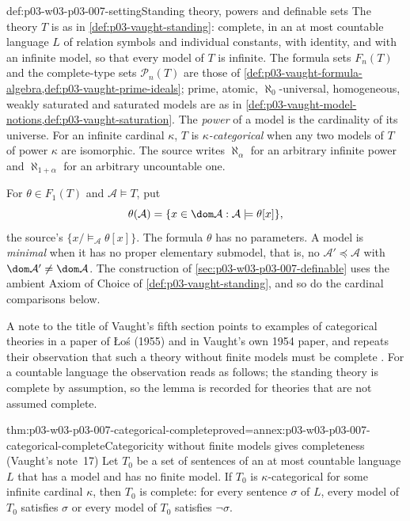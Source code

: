 \begin{hbconvention}{def:p03-w03-p03-007-setting}{Standing theory, powers and definable sets}
The theory \(T\) is as in \cref{def:p03-vaught-standing}: complete, in an at
most countable language \(L\) of relation symbols and individual constants,
with identity, and with an infinite model, so that every model of \(T\) is
infinite. The formula sets \(F_n(T)\) and the complete-type sets
\(\mathcal P_n(T)\) are those of \cref{def:p03-vaught-formula-algebra,def:p03-vaught-prime-ideals};
prime, atomic, \(\aleph_0\)-universal, homogeneous, weakly saturated and
saturated models are as in
\cref{def:p03-vaught-model-notions,def:p03-vaught-saturation}.
The \emph{power} of a model is the cardinality of its universe.
For an infinite cardinal \(\kappa\), \(T\) is \emph{\(\kappa\)-categorical}
when any two models of \(T\) of power \(\kappa\) are isomorphic. The source
writes \(\aleph_\alpha\) for an arbitrary infinite power and
\(\aleph_{1+\alpha}\) for an arbitrary uncountable one.

For \(\theta\in F_1(T)\) and \(\mathcal A\models T\), put
\[
 \theta(\mathcal A)=\{x\in\dom\mathcal A:\mathcal A\models\theta[x]\},
\]
the source's \(\{x/{\models_{\mathcal A}}\theta[x]\}\). The formula
\(\theta\) has no parameters. A model is \emph{minimal} when it has no
proper elementary submodel, that is, no \(\mathcal A'\preccurlyeq\mathcal A\)
with \(\dom\mathcal A'\neq\dom\mathcal A\).
The construction of \cref{sec:p03-w03-p03-007-definable} uses the ambient
Axiom of Choice of \cref{def:p03-vaught-standing}, and so do the cardinal
comparisons below.
\end{hbconvention}

A note to the title of Vaught's fifth section points to examples of
categorical theories in a paper of Łoś (1955) and in Vaught's own 1954
paper, and repeats their observation that such a theory without finite
models must be complete \cite[p.~315, n.~17; p.~321, refs.~9 and~19]{Vaught1961}.
For a countable language the observation reads as follows; the standing
theory is complete by assumption, so the lemma is recorded for theories
that are not assumed complete.

\begin{hblemma}{thm:p03-w03-p03-007-categorical-complete}{proved=annex:p03-w03-p03-007-categorical-complete}{Categoricity without finite models gives completeness (Vaught's note~17)}
Let \(T_0\) be a set of sentences of an at most countable language \(L\)
that has a model and has no finite model. If \(T_0\) is
\(\kappa\)-categorical for some infinite cardinal \(\kappa\), then \(T_0\) is
complete: for every sentence \(\sigma\) of \(L\), every model of \(T_0\)
satisfies \(\sigma\) or every model of \(T_0\) satisfies \(\neg\sigma\).
\end{hblemma}

